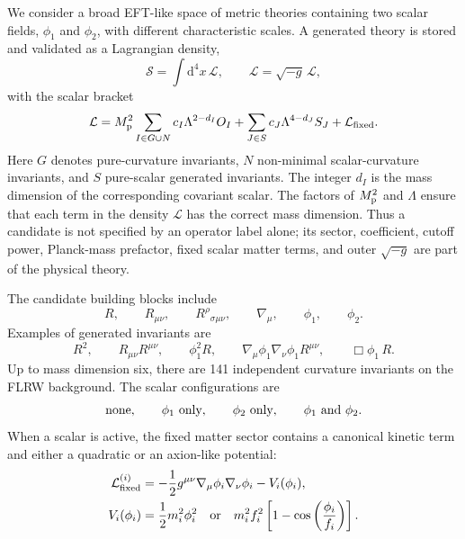\documentclass[aps,prd,twocolumn,superscriptaddress,nofootinbib,longbibliography]{revtex4-2}
\newcommand{\dd}{\mathrm{d}}
\newcommand{\Lag}{\mathcal{L}}
\newcommand{\calS}{\mathcal{S}}
\newcommand{\Mp}{M_{\rm p}}
\newcommand{\Lam}{\Lambda}
\begin{document}
We consider a broad EFT-like space of metric theories containing two scalar fields, $\phi_1$ and $\phi_2$, with different characteristic scales.  A generated theory is stored and validated as a Lagrangian density,
\begin{equation}
\calS=\int \dd^4x\,\mathscr{L},
\qquad
\mathscr{L}=\sqrt{-g}\,\Lag ,
\label{eq:action}
\end{equation}
with the scalar bracket
\begin{equation}
\Lag=
\Mp^2\sum_{I\in G\cup N}
c_I\Lam^{2-d_I}O_I
+
\sum_{J\in S}c_J\Lam^{4-d_J}S_J
+
\Lag_{\rm fixed}.
\label{eq:lagrangian}
\end{equation}
Here $G$ denotes pure-curvature invariants, $N$ non-minimal scalar-curvature invariants, and $S$ pure-scalar generated invariants.  The integer $d_I$ is the mass dimension of the corresponding covariant scalar.  The factors of $\Mp^2$ and $\Lam$ ensure that each term in the density $\mathscr{L}$ has the correct mass dimension.  Thus a candidate is not specified by an operator label alone; its sector, coefficient, cutoff power, Planck-mass prefactor, fixed scalar matter terms, and outer $\sqrt{-g}$ are part of the physical theory.

The candidate building blocks include
\begin{equation}
R,\qquad R_{\mu\nu},\qquad R^\rho{}_{\sigma\mu\nu},\qquad
\nabla_\mu,\qquad \phi_1,\qquad \phi_2 .
\end{equation}
Examples of generated invariants are
\begin{equation}
R^2,\qquad
R_{\mu\nu}R^{\mu\nu},\qquad
\phi_1^2R,\qquad
\nabla_\mu\phi_1\nabla_\nu\phi_1R^{\mu\nu},\qquad
\Box\phi_1\,R.
\end{equation}
Up to mass dimension six, there are 141 independent curvature invariants on the FLRW background.
The scalar configurations are 
\begin{equation}
\hbox{none},\qquad \phi_1\hbox{ only},\qquad \phi_2\hbox{ only},\qquad \phi_1\text{ and }\phi_2 .
\end{equation}
When a scalar is active, the fixed matter sector contains a canonical kinetic term and either a quadratic or an axion-like potential:
\begin{align}
\Lag_{\rm fixed}^{(i)}
&=-\frac12 g^{\mu\nu}\nabla_\mu\phi_i\nabla_\nu\phi_i - V_i(\phi_i),\\
V_i(\phi_i)
&=\frac12 m_i^2\phi_i^2
\quad{\rm or}\quad
m_i^2f_i^2\left[1-\cos\left(\frac{\phi_i}{f_i}\right)\right].
\label{eq:fixed-sector}
\end{align}
\end{document}
